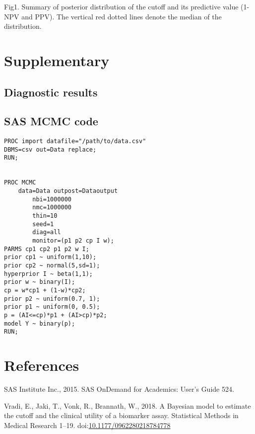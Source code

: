 \documentclass[]{elsarticle} %
\begin{document}
Fig1. Summary of posterior distribution of the cutoff and its predictive
value (1-NPV and PPV). The vertical red dotted lines denote the median
of the distribution.

\section{Supplementary}\label{supplementary}

\subsection{Diagnostic results}\label{diagnostic-results}

\subsection{SAS MCMC code}\label{sas-mcmc-code}

\begin{verbatim}
PROC import datafile="/path/to/data.csv"
DBMS=csv out=Data replace;
RUN; 


PROC MCMC 
    data=Data outpost=Dataoutput 
        nbi=1000000 
        nmc=1000000
        thin=10
        seed=1
        diag=all
        monitor=(p1 p2 cp I w); 
PARMS cp1 cp2 p1 p2 w I; 
prior cp1 ~ uniform(1,10); 
prior cp2 ~ normal(5,sd=1); 
hyperprior I ~ beta(1,1); 
prior w ~ binary(I); 
cp = w*cp1 + (1-w)*cp2; 
prior p2 ~ uniform(0.7, 1);
prior p1 ~ uniform(0, 0.5);
p = (AI<=cp)*p1 + (AI>cp)*p2; 
model Y ~ binary(p);
RUN;
\end{verbatim}

\section*{References}\label{references}

\hypertarget{refs}{}
\hypertarget{ref-SAS2015}{}
SAS Institute Inc., 2015. SAS OnDemand for Academics: User's Guide 524.

\hypertarget{ref-Vradi2018}{}
Vradi, E., Jaki, T., Vonk, R., Brannath, W., 2018. A Bayesian model to
estimate the cutoff and the clinical utility of a biomarker assay.
Statistical Methods in Medical Research 1--19.
doi:\href{https://doi.org/10.1177/0962280218784778}{10.1177/0962280218784778}
\end{document}
